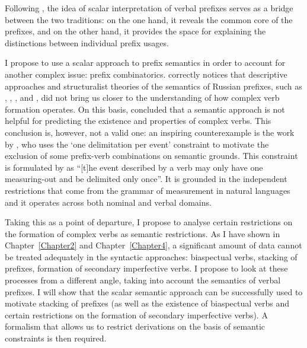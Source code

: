 Following \citet{Filip:08}, the idea of scalar interpretation of verbal prefixes serves as a bridge between the two traditions: on the one hand, it reveals the common core of the prefixes, and on the other hand, it provides the space for explaining the distinctions between individual prefix usages. 

I propose to use a scalar approach to prefix semantics in order to account for another complex issue: prefix combinatorics. \citet{Tatevosov:09} correctly notices that descriptive approaches and structuralist theories of the semantics of Russian prefixes, such as \citet{Avilova:64}, \citet{Golovin:59}, \citet{Lopatin:97}, and \citet{Tixonov:98}, did not bring us closer to the understanding of how complex verb formation operates. On this basis, \citet{Tatevosov:09} concluded that a semantic approach is not helpful for predicting the existence and properties of complex verbs. This conclusion is, however, not a valid one: an inspiring counterexample is the work by \citet{Filip:03}, who uses the `one delimitation per event' constraint to motivate the exclusion of some prefix-verb combinations on semantic grounds. This constraint is formulated by \citet[79]{Tenny:94} as ``[t]he event described by a verb may only have one measuring-out and be delimited only once''. It is grounded in the independent restrictions that come from the grammar of measurement in natural languages and it operates across both nominal and verbal domains. 

Taking this as a point of departure, I propose to analyse certain restrictions on the formation of complex verbs as semantic restrictions. As I have shown in Chapter~\ref{Chapter2} and Chapter~\ref{Chapter4}, a significant amount of data cannot be treated adequately in the syntactic approaches: biaspectual verbs, stacking of prefixes, formation of secondary imperfective verbs. I propose to look at these processes from a different angle, taking into account the semantics of verbal prefixes. I will show that the scalar semantic approach can be successfully used to motivate stacking of prefixes (as well as the existence of biaspectual verbs and certain restrictions on the formation of secondary imperfective verbs). A formalism that allows us to restrict derivations on the basis of semantic constraints is then required. 


